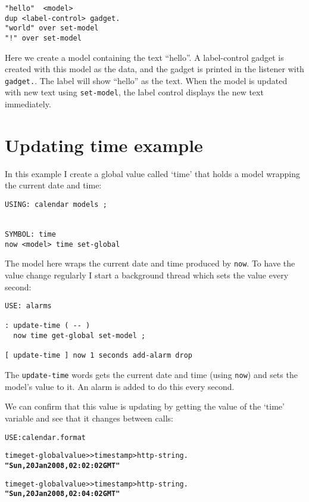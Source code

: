 \begin{verbatim}
"hello"  <model> 
dup <label-control> gadget.
"world" over set-model
"!" over set-model
\end{verbatim}

Here we create a model containing the text ``hello''. A label-control gadget is created with this model as the data, and the gadget is printed in the listener with \verb|gadget.|. The label will show ``hello'' as the text. When the model is updated with new text using \verb|set-model|, the label control displays the new text immediately.

\section{Updating time example}

In this example I create a global value called `time' that holds a
model wrapping the current date and time:

\begin{verbatim}
USING: calendar models ;


SYMBOL: time
now <model> time set-global
\end{verbatim}

The model here wraps the current date and time produced by
\verb|now|. To have the value change regularly I start a background
thread which sets the value every second:

\begin{verbatim}
USE: alarms

: update-time ( -- )
  now time get-global set-model ;

[ update-time ] now 1 seconds add-alarm drop
\end{verbatim}

The \verb|update-time| words gets the current date and time (using \verb|now|)
and sets the model's value to it. An alarm is added to do this every second.

We can confirm that this value is updating by getting the value of
the `time' variable and see that it changes between calls:

\begin{alltt}
USE: calendar.format

time get-global value>> timestamp>http-string .
  \textbf{"Sun, 20 Jan 2008, 02:02:02 GMT"} 

time get-global value>> timestamp>http-string .
  \textbf{"Sun, 20 Jan 2008, 02:04:02 GMT" }
\end{alltt}

